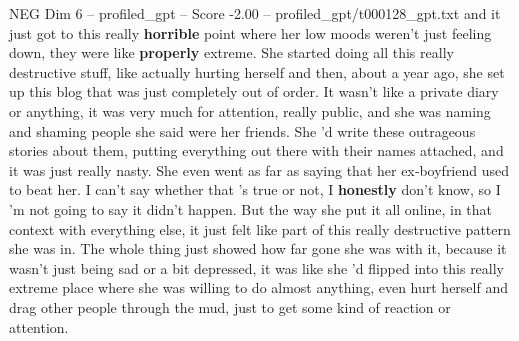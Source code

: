 \begin{textsample}{NEG Dim 6 – profiled\_gpt – Score -2.00 – profiled\_gpt/t000128\_gpt.txt}  \label{ex:f6_neg_015}
and it just got to this really \textbf{horrible} point where her low moods weren't just feeling down, they were like \textbf{properly} extreme.
She started doing all this really destructive stuff, like actually hurting herself and then, about a year ago, she set up this blog that was just completely out of order.
It wasn't like a private diary or anything, it was very much for attention, really public, and she was naming and shaming people she said were her friends.
She ’d write these outrageous stories about them, putting everything out there with their names attached, and it was just really nasty.
She even went as far as saying that her ex‑boyfriend used to beat her.
I can't say whether that ’s true or not, I \textbf{honestly} don't know, so I ’m not going to say it didn't happen.
But the way she put it all online, in that context with everything else, it just felt like part of this really destructive pattern she was in.
The whole thing just showed how far gone she was with it, because it wasn't just being sad or a bit depressed, it was like she ’d flipped into this really extreme place where she was willing to do almost anything, even hurt herself and drag other people through the mud, just to get some kind of reaction or attention.

\end{textsample}
